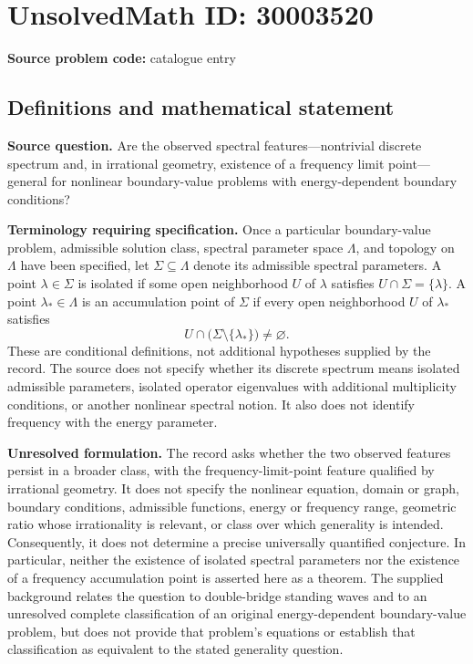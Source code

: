 \documentclass[11pt]{article}
\begin{document}
\section*{UnsolvedMath ID: 30003520}
\textbf{Source problem code:} catalogue entry
\subsection{Definitions and mathematical statement}
\textbf{Source question.} Are the observed spectral features---nontrivial discrete spectrum and, in irrational geometry, existence of a frequency limit point---general for nonlinear boundary-value problems with energy-dependent boundary conditions?

\textbf{Terminology requiring specification.} Once a particular boundary-value problem, admissible solution class, spectral parameter space \(\Lambda\), and topology on \(\Lambda\) have been specified, let \(\Sigma\subseteq\Lambda\) denote its admissible spectral parameters. A point \(\lambda\in\Sigma\) is isolated if some open neighborhood \(U\) of \(\lambda\) satisfies \(U\cap\Sigma=\{\lambda\}\). A point \(\lambda_*\in\Lambda\) is an accumulation point of \(\Sigma\) if every open neighborhood \(U\) of \(\lambda_*\) satisfies
\[
U\cap\bigl(\Sigma\setminus\{\lambda_*\}\bigr)\ne\varnothing.
\]
These are conditional definitions, not additional hypotheses supplied by the record. The source does not specify whether its discrete spectrum means isolated admissible parameters, isolated operator eigenvalues with additional multiplicity conditions, or another nonlinear spectral notion. It also does not identify frequency with the energy parameter.

\textbf{Unresolved formulation.} The record asks whether the two observed features persist in a broader class, with the frequency-limit-point feature qualified by irrational geometry. It does not specify the nonlinear equation, domain or graph, boundary conditions, admissible functions, energy or frequency range, geometric ratio whose irrationality is relevant, or class over which generality is intended. Consequently, it does not determine a precise universally quantified conjecture. In particular, neither the existence of isolated spectral parameters nor the existence of a frequency accumulation point is asserted here as a theorem. The supplied background relates the question to double-bridge standing waves and to an unresolved complete classification of an original energy-dependent boundary-value problem, but does not provide that problem's equations or establish that classification as equivalent to the stated generality question.
\end{document}
